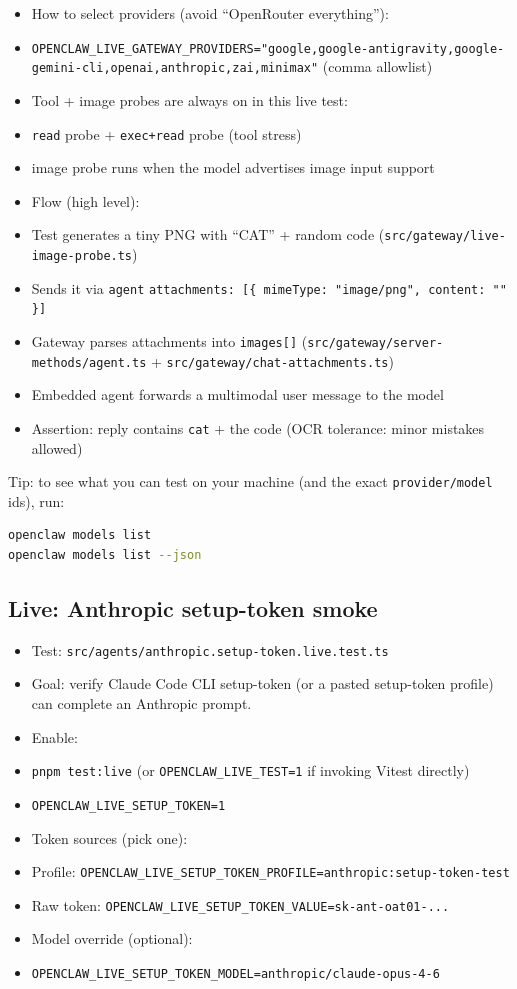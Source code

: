 \begin{itemize}
  \item How to select providers (avoid “OpenRouter everything”):
  \item \texttt{OPENCLAW\_LIVE\_GATEWAY\_PROVIDERS="google,google-antigravity,google-gemini-cli,openai,anthropic,zai,minimax"} (comma allowlist)
  \item Tool + image probes are always on in this live test:
  \item \texttt{read} probe + \texttt{exec+read} probe (tool stress)
  \item image probe runs when the model advertises image input support
  \item Flow (high level):
  \item Test generates a tiny PNG with “CAT” + random code (\texttt{src/gateway/live-image-probe.ts})
  \item Sends it via \texttt{agent} \texttt{attachments: [\{ mimeType: "image/png", content: "" \}]}
  \item Gateway parses attachments into \texttt{images[]} (\texttt{src/gateway/server-methods/agent.ts} + \texttt{src/gateway/chat-attachments.ts})
  \item Embedded agent forwards a multimodal user message to the model
  \item Assertion: reply contains \texttt{cat} + the code (OCR tolerance: minor mistakes allowed)
\end{itemize}


Tip: to see what you can test on your machine (and the exact \texttt{provider/model} ids), run:

\begin{lstlisting}[language=bash]
openclaw models list
openclaw models list --json
\end{lstlisting}


\subsection{Live: Anthropic setup-token smoke}


\begin{itemize}
  \item Test: \texttt{src/agents/anthropic.setup-token.live.test.ts}
  \item Goal: verify Claude Code CLI setup-token (or a pasted setup-token profile) can complete an Anthropic prompt.
  \item Enable:
  \item \texttt{pnpm test:live} (or \texttt{OPENCLAW\_LIVE\_TEST=1} if invoking Vitest directly)
  \item \texttt{OPENCLAW\_LIVE\_SETUP\_TOKEN=1}
  \item Token sources (pick one):
  \item Profile: \texttt{OPENCLAW\_LIVE\_SETUP\_TOKEN\_PROFILE=anthropic:setup-token-test}
  \item Raw token: \texttt{OPENCLAW\_LIVE\_SETUP\_TOKEN\_VALUE=sk-ant-oat01-...}
  \item Model override (optional):
  \item \texttt{OPENCLAW\_LIVE\_SETUP\_TOKEN\_MODEL=anthropic/claude-opus-4-6}
\end{itemize}


